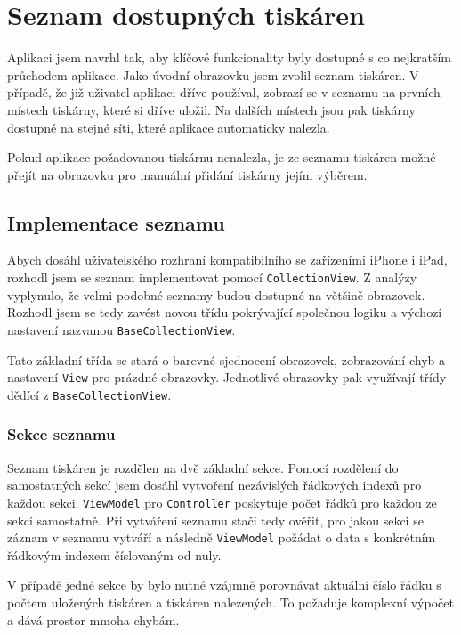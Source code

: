 \section{Seznam dostupných tiskáren}

Aplikaci jsem navrhl tak, aby klíčové funkcionality byly dostupné s co nejkratším průchodem aplikace.
Jako úvodní obrazovku jsem zvolil seznam tiskáren.
V případě, že již uživatel aplikaci dříve používal, zobrazí se v seznamu na prvních místech tiskárny, které si dříve uložil.
Na dalších místech jsou pak tiskárny dostupné na stejné síti, které aplikace automaticky nalezla.

Pokud aplikace požadovanou tiskárnu nenalezla, je ze seznamu tiskáren možné přejít na obrazovku pro manuální přidání tiskárny jejím výběrem.

\subsection{Implementace seznamu}

Abych dosáhl uživatelského rozhraní kompatibilního se zařízeními iPhone i iPad, rozhodl jsem se seznam implementovat pomocí \texttt{CollectionView}.
Z analýzy vyplynulo, že velmi podobné seznamy budou dostupné na většině obrazovek.
Rozhodl jsem se tedy zavést novou třídu pokrývající společnou logiku a výchozí nastavení nazvanou \texttt{BaseCollectionView}.

Tato základní třída se stará o barevné sjednocení obrazovek, zobrazování chyb a nastavení \texttt{View} pro prázdné obrazovky.
Jednotlivé obrazovky pak využívají třídy dědící z \texttt{BaseCollectionView}.

\subsubsection*{Sekce seznamu}

Seznam tiskáren je rozdělen na dvě základní sekce.
Pomocí rozdělení do samostatných sekcí jsem dosáhl vytvoření nezávislých řádkových indexů pro každou sekci.
\texttt{ViewModel} pro \texttt{Controller} poskytuje počet řádků pro každou ze sekcí samostatně.
Při vytváření seznamu stačí tedy ověřit, pro jakou sekci se záznam v seznamu vytváří a následně \texttt{ViewModel} požádat o data s konkrétním řádkovým indexem číslovaným od nuly.

V případě jedné sekce by bylo nutné vzájmně porovnávat aktuální číslo řádku s počtem uložených tiskáren a tiskáren nalezených.
To požaduje komplexní výpočet a dává prostor mmoha chybám.


